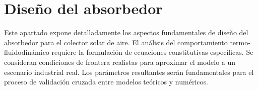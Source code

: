 \section{Diseño del absorbedor}
\label{sec:cap05_absorbedor}

Este apartado expone detalladamente los aspectos fundamentales de diseño del absorbedor para el colector solar de aire.
El análisis del comportamiento termo-fluidodinámico requiere la formulación de ecuaciones constitutivas específicas.
Se consideran condiciones de frontera realistas para aproximar el modelo a un escenario industrial real.
Los parámetros resultantes serán fundamentales para el proceso de validación cruzada entre modelos teóricos y numéricos.
